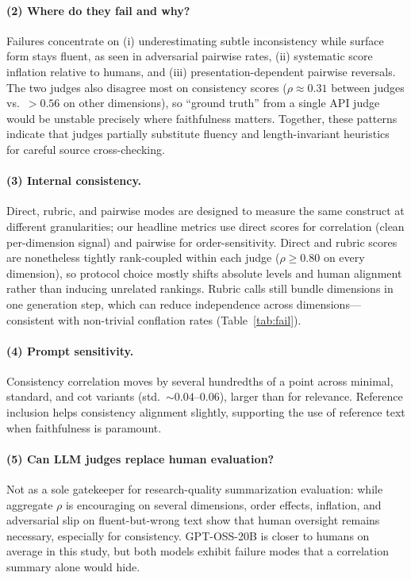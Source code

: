 \documentclass[11pt]{article}
\begin{document}
\paragraph{(2) Where do they fail and why?}
Failures concentrate on (i) underestimating subtle inconsistency while surface form stays fluent, as seen in adversarial pairwise rates, (ii) systematic score inflation relative to humans, and (iii) presentation-dependent pairwise reversals. The two judges also disagree most on consistency scores ($\rho{\approx}0.31$ between judges vs.\ ${>}0.56$ on other dimensions), so ``ground truth'' from a single API judge would be unstable precisely where faithfulness matters. Together, these patterns indicate that judges partially substitute fluency and length-invariant heuristics for careful source cross-checking.

\paragraph{(3) Internal consistency.}
Direct, rubric, and pairwise modes are designed to measure the same construct at different granularities; our headline metrics use direct scores for correlation (clean per-dimension signal) and pairwise for order-sensitivity. Direct and rubric scores are nonetheless tightly rank-coupled within each judge ($\rho{\geq}0.80$ on every dimension), so protocol choice mostly shifts absolute levels and human alignment rather than inducing unrelated rankings. Rubric calls still bundle dimensions in one generation step, which can reduce independence across dimensions---consistent with non-trivial conflation rates (Table~\ref{tab:fail}).

\paragraph{(4) Prompt sensitivity.}
Consistency correlation moves by several hundredths of a point across minimal, standard, and cot variants (std.\ ${\sim}0.04$--0.06), larger than for relevance. Reference inclusion helps consistency alignment slightly, supporting the use of reference text when faithfulness is paramount.

\paragraph{(5) Can LLM judges replace human evaluation?}
Not as a sole gatekeeper for research-quality summarization evaluation: while aggregate $\rho$ is encouraging on several dimensions, order effects, inflation, and adversarial slip on fluent-but-wrong text show that human oversight remains necessary, especially for consistency. GPT-OSS-20B is closer to humans on average in this study, but both models exhibit failure modes that a correlation summary alone would hide.
\end{document}
